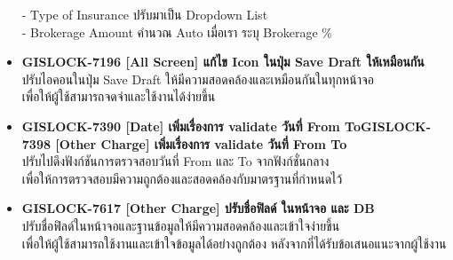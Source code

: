 \begin{itemize}
            - Type of Insurance ปรับมาเป็น Dropdown List \\
            - Brokerage Amount คำนวณ Auto เมื่อเรา ระบุ Brokerage \%
    \item \textbf{{GISLOCK-7196 [All Screen] แก้ไข Icon ในปุ่ม Save Draft ให้เหมือนกัน}} \\
          ปรับไอคอนในปุ่ม Save Draft ให้มีความสอดคล้องและเหมือนกันในทุกหน้าจอ \\
            เพื่อให้ผู้ใช้สามารถจดจำและใช้งานได้ง่ายขึ้น
    \item \textbf{{GISLOCK-7390 [Date] เพิ่มเรื่องการ validate วันที่ From ToGISLOCK-7398 [Other Charge] เพิ่มเรื่องการ validate วันที่ From To}} \\
          ปรับไปดึงฟังก์ชันการตรวจสอบวันที่ From และ To จากฟังก์ชั่นกลาง \\ 
            เพื่อให้การตรวจสอบมีความถูกต้องและสอดคล้องกับมาตรฐานที่กำหนดไว้
    \item \textbf{{GISLOCK-7617 [Other Charge] ปรับชื่อฟิลด์ ในหน้าจอ และ DB}} \\
            ปรับชื่อฟิลด์ในหน้าจอและฐานข้อมูลให้มีความสอดคล้องและเข้าใจง่ายขึ้น \\
                เพื่อให้ผู้ใช้สามารถใช้งานและเข้าใจข้อมูลได้อย่างถูกต้อง หลังจากที่ได้รับข้อเสนอแนะจากผู้ใช้งาน
\end{itemize}